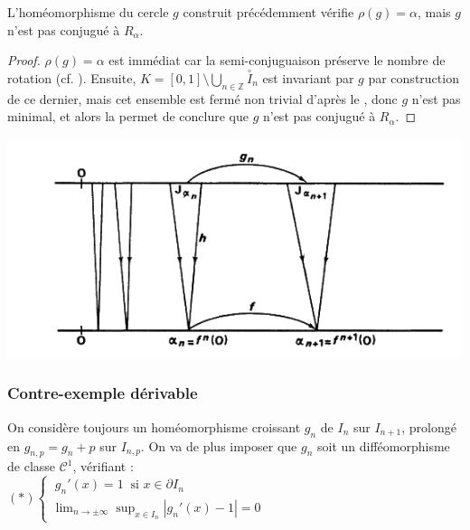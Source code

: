 \documentclass[11pt,a4paper]{article}
\begin{document}
\begin{thm}\label{cont}
L'homéomorphisme du cercle $g$ construit précédemment vérifie $\rho(g)=\alpha$, mais $g$ n'est pas conjugué à $R_\alpha$.
\end{thm}

\begin{proof}
$\rho(g)=\alpha$ est immédiat car la semi-conjuguaison préserve le nombre de rotation (cf. \cite{dgv}).
Ensuite, $K = [0,1] \setminus \bigcup_{n \in \mathbb{Z}} \overset{\circ}I_{n}$ est invariant par $g$ par construction de ce dernier, mais cet ensemble est fermé non trivial d'après le  , donc $g$ n'est pas minimal, et alors la  permet de conclure que $g$ n'est pas conjugué à $R_\alpha$. 
\end{proof}

\begin{centering}
\includegraphics[scale=0.452]{diagram.png}
\end{centering}

\subsubsection{Contre-exemple dérivable}

On considère toujours un homéomorphisme croissant $g_n$ de $I_n$ sur $I_{n+1}$, prolongé en $g_{n,p} = g_n +p$ sur $I_{n,p}$. On va de plus imposer que $g_n$ soit un difféomorphisme de classe $\mathcal{C}^1$, vérifiant : \\

$(*) \begin{cases}\ g_n'(x)=1 \ \text{ si } x \in \partial I_n \\ \displaystyle \lim_{n \to \pm \infty}\sup_{x\in I_n}|g_n'(x)-1|=0 \end{cases}$ \\
\end{document}
